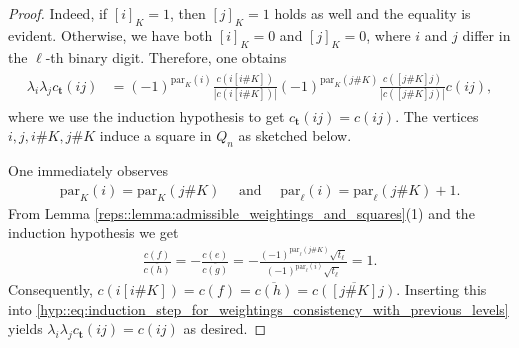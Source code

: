 \documentclass[a4paper]{amsart}
\begin{document}
\begin{proof}
    Indeed, if $[i]_K = 1$, then $[j]_K = 1$ holds as well and the equality is evident. Otherwise, we have both $[i]_K = 0$ and $[j]_K = 0$, where $i$ and $j$ differ in the $\ell$-th binary digit. Therefore, one obtains
    \begin{align}
        \label{hyp::eq:induction_step_for_weightings_consistency_with_previous_levels}
        \begin{aligned}
        \lambda_i \lambda_j c_\mathbf{t}(ij) 
            &= (-1)^{\mathrm{par}_K(i)} \frac{c(i[i \# K])}{|c(i[i \# K])|} (-1)^{\mathrm{par}_K(j \#K)} \frac{c([j \# K] j)}{|c([j \# K] j)|} c(ij),
        \end{aligned}
    \end{align}
    where we use the induction hypothesis to get $c_\mathbf{t}(ij) = c(ij)$. The vertices $i, j, i \# K, j \# K$ induce a square in $Q_n$ as sketched below.
    \begin{center}
    \end{center}
    One immediately observes 
    \begin{align*}
       \mathrm{par}_K(i) = \mathrm{par}_K(j \# K) 
       \quad \text{ and } \quad
       \mathrm{par}_\ell(i) = \mathrm{par}_\ell(j \# K) + 1.
    \end{align*}
    From Lemma \ref{reps::lemma:admissible_weightings_and_squares}(1) and the induction hypothesis we get 
    \begin{align*}
        \frac{c(f)}{\overline{c(h)}} = - \frac{c(e)}{\overline{c(g)}} = - \frac{(-1)^{\mathrm{par}_\ell(j\# K)} \sqrt{t_\ell}}{(-1)^{\mathrm{par}_\ell(i)} \sqrt{t_\ell}} 
        = 1.
    \end{align*}
    Consequently, $c(i[i\# K]) = c(f) = \overline{c(h)} = \overline{c([j\# K] j)}$.
    Inserting this into \eqref{hyp::eq:induction_step_for_weightings_consistency_with_previous_levels} yields $\lambda_i \lambda_j c_\mathbf{t}(ij) = c(ij)$ as desired. 
    

\end{proof}
\end{document}
